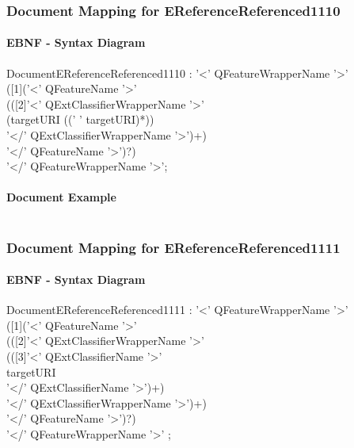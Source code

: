 \documentclass[11pt,a4paper]{article}
\begin{document}
\subsubsection{Document Mapping for EReferenceReferenced1110}
\paragraph{EBNF - Syntax Diagram}
\begin{rail}
DocumentEReferenceReferenced1110 :  '<' QFeatureWrapperName '>' \\
([1]('<' QFeatureName '>'  \\
(([2]'<' QExtClassifierWrapperName '>'\\
(targetURI ((' ' targetURI)*)) \\
'</' QExtClassifierWrapperName '>')+) \\
'</' QFeatureName '>')?) \\
'</' QFeatureWrapperName '>';
\end{rail}

\paragraph{Document Example}
\inputminted[fontsize=\footnotesize]{xml}{examples/EReferenceReferenced1110.xml}


\subsubsection{Document Mapping for EReferenceReferenced1111}
\paragraph{EBNF - Syntax Diagram}
\begin{rail}
DocumentEReferenceReferenced1111 : '<' QFeatureWrapperName '>' \\
([1]('<' QFeatureName '>'  \\
(([2]'<' QExtClassifierWrapperName '>'\\
(([3]'<' QExtClassifierName  '>' \\ 
targetURI \\ 
'</' QExtClassifierName  '>')+) \\
'</' QExtClassifierWrapperName '>')+) \\
'</' QFeatureName '>')?) \\
'</' QFeatureWrapperName '>' ;
\end{rail}
\end{document}
